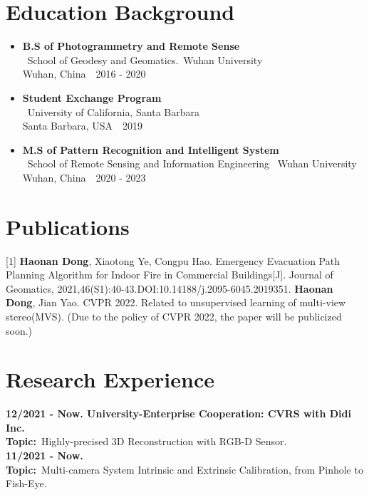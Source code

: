 \documentclass[a4paper]{article}
\begin{document}
\section{Education Background}
\vspace{-0.5em}
\begin{itemize}[itemsep = -0.5em,topsep = 0em]
    \item \textbf{B.S of Photogrammetry and Remote Sense}
          \\\ School of Geodesy and Geomatics.\ Wuhan University\\ Wuhan, China\ \ 2016 - 2020
    \item \textbf{Student Exchange Program}
          \\\ University of California, Santa Barbara\\ Santa Barbara, USA\ \ 2019
    \item \textbf{M.S of Pattern Recognition and Intelligent System}
          \\\ School of Remote Sensing and Information Engineering \ Wuhan University\\ Wuhan, China\ \ 2020 - 2023
\end{itemize}


\section{Publications}
\vspace{-0.5em}
[1] \textbf{Haonan Dong}, Xiaotong Ye, Congpu Hao. Emergency Evacuation Path Planning Algorithm for Indoor Fire in Commercial Buildings[J]. Journal of Geomatics, 2021,46(S1):40-43.DOI:10.14188/j.2095-6045.2019351.
\newline
[2] \textbf{Haonan Dong}, Jian Yao. CVPR 2022. Related to unsupervised learning of multi-view stereo(MVS). (Due to the policy of CVPR 2022, the paper will be publicized soon.)


\section{Research Experience}
\vspace{-0.5em}
\textbf{12/2021 - Now. University-Enterprise Cooperation: CVRS with Didi Inc.}\\
\textbf{Topic:}\ Highly-precised 3D Reconstruction with RGB-D Sensor.\\
\textbf{11/2021 - Now.}\\
\textbf{Topic:}\ Multi-camera System Intrinsic and Extrinsic Calibration, from Pinhole to Fish-Eye.\\
\end{document}
